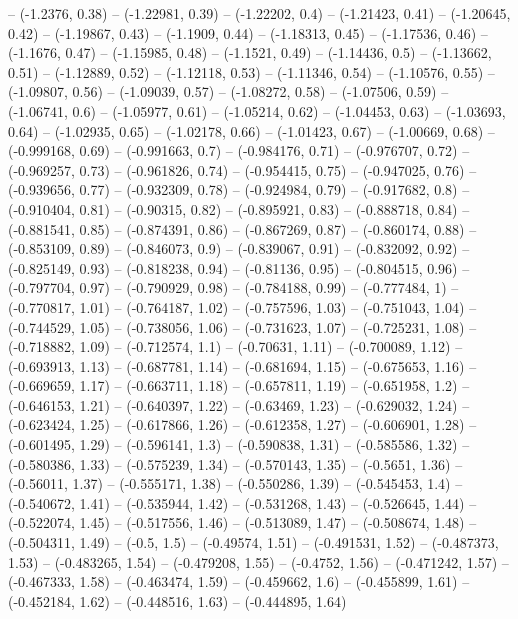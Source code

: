 -- (-1.2376, 0.38)
-- (-1.22981, 0.39)
-- (-1.22202, 0.4)
-- (-1.21423, 0.41)
-- (-1.20645, 0.42)
-- (-1.19867, 0.43)
-- (-1.1909, 0.44)
-- (-1.18313, 0.45)
-- (-1.17536, 0.46)
-- (-1.1676, 0.47)
-- (-1.15985, 0.48)
-- (-1.1521, 0.49)
-- (-1.14436, 0.5)
-- (-1.13662, 0.51)
-- (-1.12889, 0.52)
-- (-1.12118, 0.53)
-- (-1.11346, 0.54)
-- (-1.10576, 0.55)
-- (-1.09807, 0.56)
-- (-1.09039, 0.57)
-- (-1.08272, 0.58)
-- (-1.07506, 0.59)
-- (-1.06741, 0.6)
-- (-1.05977, 0.61)
-- (-1.05214, 0.62)
-- (-1.04453, 0.63)
-- (-1.03693, 0.64)
-- (-1.02935, 0.65)
-- (-1.02178, 0.66)
-- (-1.01423, 0.67)
-- (-1.00669, 0.68)
-- (-0.999168, 0.69)
-- (-0.991663, 0.7)
-- (-0.984176, 0.71)
-- (-0.976707, 0.72)
-- (-0.969257, 0.73)
-- (-0.961826, 0.74)
-- (-0.954415, 0.75)
-- (-0.947025, 0.76)
-- (-0.939656, 0.77)
-- (-0.932309, 0.78)
-- (-0.924984, 0.79)
-- (-0.917682, 0.8)
-- (-0.910404, 0.81)
-- (-0.90315, 0.82)
-- (-0.895921, 0.83)
-- (-0.888718, 0.84)
-- (-0.881541, 0.85)
-- (-0.874391, 0.86)
-- (-0.867269, 0.87)
-- (-0.860174, 0.88)
-- (-0.853109, 0.89)
-- (-0.846073, 0.9)
-- (-0.839067, 0.91)
-- (-0.832092, 0.92)
-- (-0.825149, 0.93)
-- (-0.818238, 0.94)
-- (-0.81136, 0.95)
-- (-0.804515, 0.96)
-- (-0.797704, 0.97)
-- (-0.790929, 0.98)
-- (-0.784188, 0.99)
-- (-0.777484, 1)
-- (-0.770817, 1.01)
-- (-0.764187, 1.02)
-- (-0.757596, 1.03)
-- (-0.751043, 1.04)
-- (-0.744529, 1.05)
-- (-0.738056, 1.06)
-- (-0.731623, 1.07)
-- (-0.725231, 1.08)
-- (-0.718882, 1.09)
-- (-0.712574, 1.1)
-- (-0.70631, 1.11)
-- (-0.700089, 1.12)
-- (-0.693913, 1.13)
-- (-0.687781, 1.14)
-- (-0.681694, 1.15)
-- (-0.675653, 1.16)
-- (-0.669659, 1.17)
-- (-0.663711, 1.18)
-- (-0.657811, 1.19)
-- (-0.651958, 1.2)
-- (-0.646153, 1.21)
-- (-0.640397, 1.22)
-- (-0.63469, 1.23)
-- (-0.629032, 1.24)
-- (-0.623424, 1.25)
-- (-0.617866, 1.26)
-- (-0.612358, 1.27)
-- (-0.606901, 1.28)
-- (-0.601495, 1.29)
-- (-0.596141, 1.3)
-- (-0.590838, 1.31)
-- (-0.585586, 1.32)
-- (-0.580386, 1.33)
-- (-0.575239, 1.34)
-- (-0.570143, 1.35)
-- (-0.5651, 1.36)
-- (-0.56011, 1.37)
-- (-0.555171, 1.38)
-- (-0.550286, 1.39)
-- (-0.545453, 1.4)
-- (-0.540672, 1.41)
-- (-0.535944, 1.42)
-- (-0.531268, 1.43)
-- (-0.526645, 1.44)
-- (-0.522074, 1.45)
-- (-0.517556, 1.46)
-- (-0.513089, 1.47)
-- (-0.508674, 1.48)
-- (-0.504311, 1.49)
-- (-0.5, 1.5)
-- (-0.49574, 1.51)
-- (-0.491531, 1.52)
-- (-0.487373, 1.53)
-- (-0.483265, 1.54)
-- (-0.479208, 1.55)
-- (-0.4752, 1.56)
-- (-0.471242, 1.57)
-- (-0.467333, 1.58)
-- (-0.463474, 1.59)
-- (-0.459662, 1.6)
-- (-0.455899, 1.61)
-- (-0.452184, 1.62)
-- (-0.448516, 1.63)
-- (-0.444895, 1.64)
